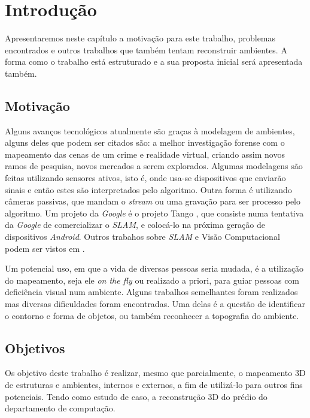 \chapter{Introdução}

Apresentaremos neste capítulo a motivação para este trabalho, problemas encontrados e outros trabalhos que também tentam reconstruir ambientes. A forma como o trabalho está estruturado e a sua proposta inicial será apresentada também.

\section{Motivação}

Alguns avanços tecnológicos atualmente são graças à modelagem de ambientes, alguns deles que podem ser citados são: a melhor investigação forense com o mapeamento das cenas de um crime \cite{FIT3D} e realidade virtual, criando assim novos ramos de pesquisa, novos mercados a serem explorados. Algumas modelagens são feitas utilizando sensores ativos, isto é, onde usa-se dispositivos que enviarão sinais e então estes são interpretados pelo algoritmo. Outra forma é utilizando câmeras passivas, que mandam o \textit{stream} ou uma gravação para ser processo pelo algoritmo. Um projeto da \textit{Google} é o projeto Tango \cite{Tango}, que consiste numa tentativa da \textit{Google} de comercializar o \textit{SLAM}, e colocá-lo na próxima geração de dispositivos \textit{Android}. Outros trabahos sobre \textit{SLAM} e Visão Computacional podem ser vistos em \cite{Trabalhos-Geral-SLAM}.

Um potencial uso, em que a vida de diversas pessoas seria mudada, é a utilização do mapeamento, seja ele \textit{on the fly} ou realizado a priori, para guiar pessoas com deficiência visual num ambiente. Alguns trabalhos semelhantes foram realizados mas diversas dificuldades foram encontradas. Uma delas é a questão de identificar o contorno e forma de objetos, ou também reconhecer a topografia do ambiente. 

\section{Objetivos}

Os objetivo deste trabalho é realizar, mesmo que parcialmente, o mapeamento 3D de estruturas e ambientes, internos e externos, a fim de utilizá-lo para outros fins potenciais. Tendo como estudo de caso, a reconstrução 3D do prédio do departamento de computação.

